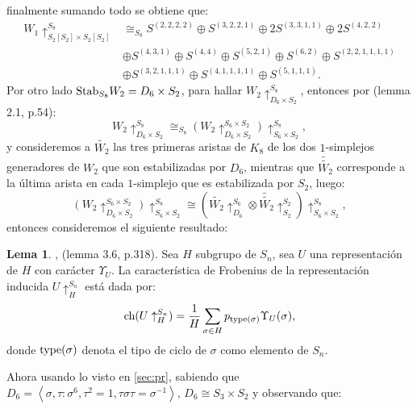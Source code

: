 \documentclass[12pt]{book}
\theoremstyle{definition}
\newtheorem{lemma}[theorem]{Lema}
\newcounter{in}
\begin{document}
finalmente sumando todo se obtiene que:
\begin{equation}
\label{s_w_1}
\begin{aligned}
W_{1} \uparrow_{S_{2} \left [ S_{2} \right ] \times S_{2} \left [ S_{2} \right ]}^{S_{8}} & \cong_{S_{8}} S^{(2, 2, 2, 2)} \oplus S^{(3, 2, 2, 1)} \oplus  2S^{(3, 3, 1, 1)} \oplus 2S^{(4, 2, 2)} \\
& \oplus S^{(4, 3, 1)} \oplus S^{(4, 4)} \oplus S^{(5, 2, 1)} \oplus S^{(6, 2)} \oplus S^{(2, 2, 1, 1, 1, 1)} \\
& \oplus S^{(3, 2, 1, 1, 1)} \oplus S^{(4, 1, 1, 1, 1)} \oplus S^{(5, 1, 1, 1)}.
\end{aligned}
\end{equation}
Por otro lado $\textup{Stab}_{S_{8}} W_{2} = D_{6} \times S_{2}$, para hallar $W_{2} \uparrow_{ D_{6} \times S_{2}}^{S_{8}}$, entonces por \cite{karpilovsky1990induced} (lemma 2.1, p.54):
\begin{equation}
W_{2} \uparrow_{D_{6} \times S_{2}}^{S_{8}}  \cong_{S_{8}} (W_{2} \uparrow_{D_{6} \times S_{2}}^{S_{6} \times S_{2}} ) \uparrow_{S_{6} \times S_{2}}^{S_{8}}, 
\end{equation}
y consideremos a $\tilde{W_{2}}$ las tres primeras aristas de $K_{8}$ de los dos $1$-simplejos generadores de $W_{2}$ que son estabilizadas por $D_{6}$, mientras que $\tilde{\tilde{W_{2}}}$ corresponde a la última arista en cada $1$-simplejo que es estabilizada por $S_{2}$, luego:
\begin{equation}
\label{300}
(W_{2} \uparrow_{D_{6} \times S_{2}}^{S_{6} \times S_{2}} ) \uparrow_{S_{6} \times S_{2}}^{S_{8}} \cong  (\tilde{W_{2}} \uparrow_{D_{6}}^{S_{6}} \otimes \tilde{\tilde{W_{2}}} \uparrow_{S_{2}}^{S_{2}}) \uparrow_{S_{6}\times S_{2}}^{S_{8}},
\end{equation}
entonces consideremos el siguiente resultado:
\begin{lemma}{\cite{sundaram1994plethysm}, (lemma 3.6, p.318)}.
\label{sun_ch_fb}
Sea $H$ subgrupo de $S_{n}$, sea $U$ una representación de $H$ con carácter $\Upsilon_{U}$. La característica de Frobenius de la representación inducida $U \uparrow_{H}^{S_{n}}$ está dada por:
$$\textup{ch}(U\uparrow_{H}^{S_{n}}) = \frac{1}{H} \sum_{\sigma \in H} p_{\textup{type}(\sigma)} \Upsilon_{U}(\sigma),$$
donde $\textup{type}(\sigma)$ denota el tipo de ciclo de $\sigma$ como elemento de $S_{n}$.
\end{lemma}
Ahora usando lo visto en \ref{sec:pr}, sabiendo que $D_{6}=\left \langle \sigma,\tau \colon \sigma^{6}, \tau^{2}=1, \tau \sigma \tau = \sigma^{-1} \right \rangle$, $D_{6} \cong S_{3} \times S_{2}$ y observando que:
\end{document}
